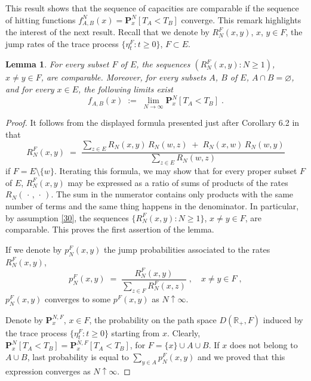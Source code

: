 \documentclass[reqno]{amsart}
\newtheorem{lemma}[theorem]{Lemma}
\begin{document}
This result shows that the sequence of capacities are comparable if
the sequence of hitting functions $f_{A,B}^N(x) = {{\mathbf P}}^N_x[T_A<T_B]$
converge. This remark highlights the interest of the next result.
Recall that we denote by $R^F_N(x,y)$, $x$, $y\in F$, the jump rates
of the trace process $\{\eta^F_t : t\ge 0\}$, $F\subset E$.

\begin{lemma}
\label{s29}
For every subset $F$ of $E$, the sequences $(R^F_N(x,y):N\ge 1)$,
$x\not = y\in F$, are comparable. Moreover, for every subsets $A$, $B$
of $E$, $A\cap B=\varnothing$, and for every $x\in E$, the following
limits exist
\begin{equation*} 
f_{A,B}(x)\;:=\; \lim_{N\to\infty} {{\mathbf P}}^{N}_x [T_{A} < T_{B}] \;.
\end{equation*}
\end{lemma}

\begin{proof}
It follows from the displayed formula presented just after Corollary
6.2 in \cite{bl2} that
\begin{equation*}
R^F_N(x,y) \;=\; \frac{ \sum_{z\in E} R_N (x,y) \, R_N(w,z) \;+\; R_N(x,w)
\,R_N(w,y)}{\sum_{z\in E} R_N(w,z)}
\end{equation*}
if $F = E\setminus \{w\}$. Iterating this formula, we may show that
for every proper subset $F$ of $E$, $R^F_N(x,y)$ may be expressed as a
ratio of sums of products of the rates $R_N(\,\cdot\,,\,\cdot\,)$.
The sum in the numerator contains only products with the same number
of terms and the same thing happens in the denominator. In particular,
by assumption \eqref{30}, the sequences $\{R^F_N(x,y) : N\ge 1\}$,
$x\not = y \in F$, are comparable. This proves the first assertion of
the lemma.

If we denote by $p^F_N(x,y)$ the jump probabilities associated to the
rates $R^F_N(x,y)$,
\begin{equation*}
p^F_N(x,y) \;=\; \frac{R^F_N(x,y)}{\sum_{z\in F} R^F_N(x,z)}\;, \quad 
x\not = y \in F\;,
\end{equation*}
$p^F_N(x,y)$ converges to some $p^F(x,y)$ as $N\uparrow\infty$.

Denote by ${{\mathbf P}}^{N,F}_x$, $x\in F$, the probability on the path space
$D({{\mathbb R}}_+, F)$ induced by the trace process $\{\eta^F_t : t\ge 0\}$
starting from $x$. Clearly, ${{\mathbf P}}^{N}_x [T_{A} < T_{B}] = {{\mathbf P}}^{N,F}_x [T_{A} < T_{B}]$, for $F=\{x\}\cup A\cup B$. If $x$ does not
belong to $A\cup B$, last probability is equal to $\sum_{y\in A}
p^F_N(x,y)$ and we proved that this expression converges as
$N\uparrow\infty$.
\end{proof}
\end{document}
